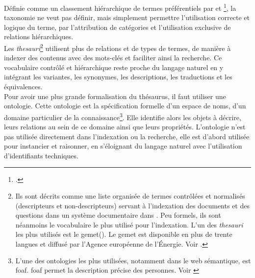 Définie comme un \og classement hiérarchique de termes préférentiels\fg{} par  et \footcite{rosenfeld_information_2015}, la taxonomie ne veut pas définir, mais simplement permettre l'utilisation correcte et logique du terme, par l'attribution de catégories et l'utilisation exclusive de relations hiérarchiques.\\

Les \textit{thesauri}\footnote{Ils sont décrits comme une \og liste organisée de termes contrôlées et normalisés (descripteurs et non-descripteurs) servant à l’indexation des documents et des questions dans un système documentaire\fg{} dans \cite{degez_thesauroglossaire_2001}. Peu formels, ils sont néanmoins le vocabulaire le plus utilisé pour l'indexation. L'un des \textit{thesauri} les plus utilisés est le \ac{gemet}(\cite{noauthor_general_nodate}). Le \ac{gemet} est disponible en plus de trente langues et diffusé par l'Agence européenne de l'Énergie. Voir .} utilisent plus de relations et de types de termes, de manière à indexer des contenus avec des mots-clés et faciliter ainsi la recherche. Ce vocabulaire contrôlé et hiérarchique reste proche du langage naturel en y intégrant les variantes, les synonymes, les descriptions, les traductions et les équivalences.\\

Pour avoir une plus grande formalisation du thésaurus, il faut utiliser une ontologie. Cette ontologie est la spécification formelle d'un espace de noms, d'un domaine particulier de la connaissance\footnote{L'une des ontologies les plus utilisées, notamment dans le web sémantique, est \ac{foaf}. \ac{foaf} permet la description précise des personnes. Voir \cite{noauthor_foaf_nodate}}. Elle identifie alors les objets à décrire, leurs relations au sein de ce domaine ainsi que leurs propriétés. L'ontologie n'est pas utilisée directement dans l'indexation ou la recherche, elle est d'abord utilisée pour instancier et raisonner, en s'éloignant du langage naturel avec l'utilisation d'identifiants techniques.\\


